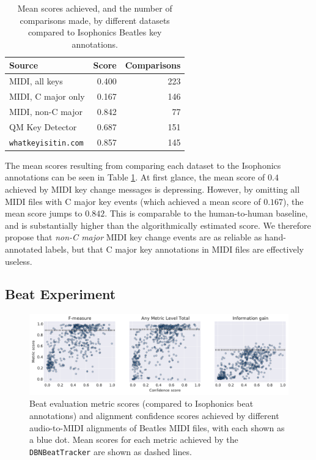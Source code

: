 \documentclass{article}
\begin{document}
\begin{table}
\begin{center}
\begin{tabular}{lrr}
  \toprule
  Source                     & Score & Comparisons \\
  \midrule
  MIDI, all keys             & 0.400 &         223 \\
  MIDI, C major only         & 0.167 &         146 \\
  MIDI, non-C major          & 0.842 &          77 \\
  QM Key Detector            & 0.687 &         151 \\
  \texttt{whatkeyisitin.com} & 0.857 &         145 \\
  \bottomrule
\end{tabular}
\end{center}
  \caption{Mean scores achieved, and the number of comparisons made, by different datasets compared to Isophonics Beatles key annotations.}
  \label{tab:key}
\end{table}

The mean scores resulting from comparing each dataset to the Isophonics annotations can be seen in Table \ref{tab:key}.
At first glance, the mean score of $0.4$ achieved by MIDI key change messages is depressing.
However, by omitting all MIDI files with C major key events (which achieved a mean score of $0.167$), the mean score jumps to $0.842$.
This is comparable to the human-to-human baseline, and is substantially higher than the algorithmically estimated score.
We therefore propose that \textit{non-C major} MIDI key change events are as reliable as hand-annotated labels, but that C major key annotations in MIDI files are effectively useless.

\subsection{Beat Experiment}

\begin{figure}
    \centerline{
    \includegraphics[width=\textwidth]{beat_scores.pdf}}
    \caption{Beat evaluation metric scores (compared to Isophonics beat annotations) and alignment confidence scores achieved by different audio-to-MIDI alignments of Beatles MIDI files, with each shown as a blue dot.
Mean scores for each metric achieved by the \texttt{DBNBeatTracker} \cite{bock2014multi} are shown as dashed lines.}
    \label{fig:beat}
\end{figure}
\end{document}
